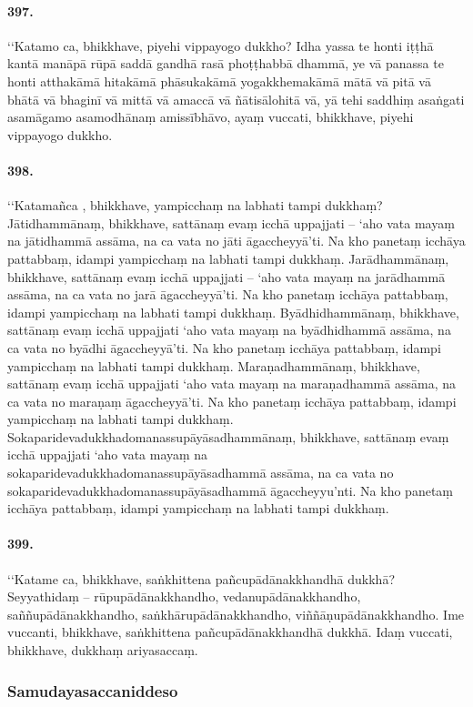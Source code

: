 \paragraph{397.} ‘‘Katamo ca, bhikkhave, piyehi vippayogo dukkho? Idha yassa te honti iṭṭhā kantā manāpā rūpā saddā gandhā rasā phoṭṭhabbā dhammā, ye vā panassa te honti atthakāmā hitakāmā phāsukakāmā yogakkhemakāmā mātā vā pitā vā bhātā vā bhaginī vā mittā vā amaccā vā ñātisālohitā vā, yā tehi saddhiṃ asaṅgati asamāgamo asamodhānaṃ amissībhāvo, ayaṃ vuccati, bhikkhave, piyehi vippayogo dukkho.

\paragraph{398.} ‘‘Katamañca , bhikkhave, yampicchaṃ na labhati tampi dukkhaṃ? Jātidhammānaṃ, bhikkhave, sattānaṃ evaṃ icchā uppajjati – ‘aho vata mayaṃ na jātidhammā assāma, na ca vata no jāti āgaccheyyā’ti. Na kho panetaṃ icchāya pattabbaṃ, idampi yampicchaṃ na labhati tampi dukkhaṃ. Jarādhammānaṃ, bhikkhave, sattānaṃ evaṃ icchā uppajjati – ‘aho vata mayaṃ na jarādhammā assāma, na ca vata no jarā āgaccheyyā’ti. Na kho panetaṃ icchāya pattabbaṃ, idampi yampicchaṃ na labhati tampi dukkhaṃ. Byādhidhammānaṃ, bhikkhave, sattānaṃ evaṃ icchā uppajjati ‘aho vata mayaṃ na byādhidhammā assāma, na ca vata no byādhi āgaccheyyā’ti. Na kho panetaṃ icchāya pattabbaṃ, idampi yampicchaṃ na labhati tampi dukkhaṃ. Maraṇadhammānaṃ, bhikkhave, sattānaṃ evaṃ icchā uppajjati ‘aho vata mayaṃ na maraṇadhammā assāma, na ca vata no maraṇaṃ āgaccheyyā’ti. Na kho panetaṃ icchāya pattabbaṃ, idampi yampicchaṃ na labhati tampi dukkhaṃ. Sokaparidevadukkhadomanassupāyāsadhammānaṃ, bhikkhave, sattānaṃ evaṃ icchā uppajjati ‘aho vata mayaṃ na sokaparidevadukkhadomanassupāyāsadhammā assāma, na ca vata no sokaparidevadukkhadomanassupāyāsadhammā āgaccheyyu’nti. Na kho panetaṃ icchāya pattabbaṃ, idampi yampicchaṃ na labhati tampi dukkhaṃ.

\paragraph{399.} ‘‘Katame ca, bhikkhave, saṅkhittena pañcupādānakkhandhā dukkhā? Seyyathidaṃ – rūpupādānakkhandho, vedanupādānakkhandho, saññupādānakkhandho, saṅkhārupādānakkhandho, viññāṇupādānakkhandho. Ime vuccanti, bhikkhave, saṅkhittena pañcupādānakkhandhā dukkhā. Idaṃ vuccati, bhikkhave, dukkhaṃ ariyasaccaṃ.

\subsubsection{Samudayasaccaniddeso}

